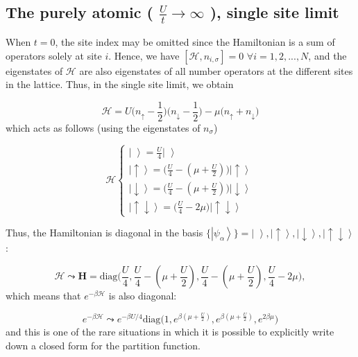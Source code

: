 \subsection{The purely atomic ( $\frac{U}{t} \rightarrow \infty$ ), single site limit}
\label{subsec:atomic}

When $t = 0$, the site index may be omitted since the Hamiltonian is a sum of operators solely at site $i$.
Hence, we have $[ \mathcal{H}, n_{i,\sigma} ] = 0 \,\, \forall i = 1, 2,..., N $, and the eigenstates of $\mathcal{H}$ are also eigenstates of all number operators at the different sites in the lattice.
Thus, in the single site limit, we obtain

\begin{equation}
\mathcal{H} = U \bigg(n_\uparrow - \frac{1}{2} \bigg) \bigg(n_\downarrow - \frac{1}{2} \bigg) - \mu \bigg( n_\uparrow + n_\downarrow \bigg)
\end{equation}
which acts as follows (using the eigenstates of $n_\sigma$)

\begin{equation}
\mathcal{H} \begin{cases}
\left| \,\, \right\rangle = \frac{U}{4} \left| \,\, \right\rangle \\
\left| \uparrow \right\rangle = \bigg( \frac{U}{4} - (\mu + \frac{U}{2} ) \bigg) \left| \uparrow \right\rangle \\
\left| \downarrow \right\rangle = \bigg( \frac{U}{4} - (\mu + \frac{U}{2} ) \bigg) \left| \downarrow \right\rangle \\
\left| \uparrow \downarrow \right\rangle = \bigg( \frac{U}{4} - 2 \mu \bigg) \left| \uparrow \downarrow \right\rangle
\end{cases}
\end{equation}

Thus, the Hamiltonian is diagonal in the basis $\{\left| \psi_\alpha \right\rangle \} = \left| \,\, \right\rangle, \left|\uparrow \right\rangle, \left|\downarrow\right \rangle, \left|\uparrow \downarrow \right\rangle $:

\begin{equation}
\mathcal{H} \leadsto \bm H = \text{diag}\bigg(\frac{U}{4}, \frac{U}{4} - (\mu + \frac{U}{2} ), \frac{U}{4} - (\mu + \frac{U}{2} ), \frac{U}{4} - 2 \mu \bigg) ,
\end{equation}
which means that $e^{-\beta \mathcal{H} }$ is also diagonal:

\begin{equation}
e^{-\beta \mathcal{H} } \leadsto e^{-\beta U / 4}  \text{diag}\bigg(1,  e^{\beta(\mu + \frac{U}{2})}, e^{\beta(\mu + \frac{U}{2})},  e^{2\beta \mu} \bigg)
\end{equation}
and this is one of the rare situations in which it is possible to explicitly write down a closed form for the partition function.

